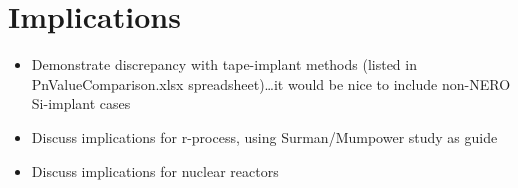 \section{Implications}
  \begin{itemize}
    \item Demonstrate discrepancy with tape-implant methods (listed
	 in PnValueComparison.xlsx spreadsheet)\dots it would be nice to
	 include non-NERO Si-implant cases
    \item Discuss implications for r-process, using Surman/Mumpower study as
	 guide
	 \item Discuss implications for nuclear reactors
  \end{itemize}